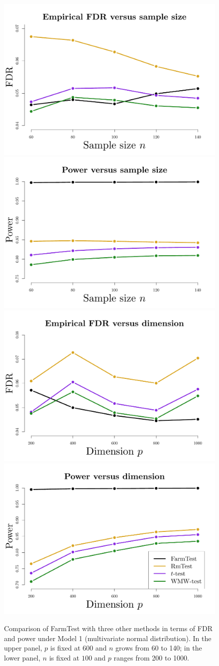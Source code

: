 \begin{figure}[!t]
\centering
                \includegraphics[width=.45\textwidth ]{figures/FDP_normal_fixp.pdf}
                \includegraphics[width=.45\textwidth ]{figures/Power_normal_fixp.pdf} \\
                \includegraphics[width=.45\textwidth ]{figures/FDP_normal_fixn.pdf}
                \includegraphics[width=.45\textwidth ]{figures/Power_normal_fixn.pdf}
                \caption {Comparison of {FarmTest} with three other methods in terms of FDR and power under Model 1 (multivariate normal distribution). In the upper panel,  $p$ is fixed at $600$ and $n$ grows from 60 to 140; in the lower panel, $n$ is fixed at $100$ and $p$ ranges from 200 to 1000.}
                \label{fig:normal}
\end{figure}


